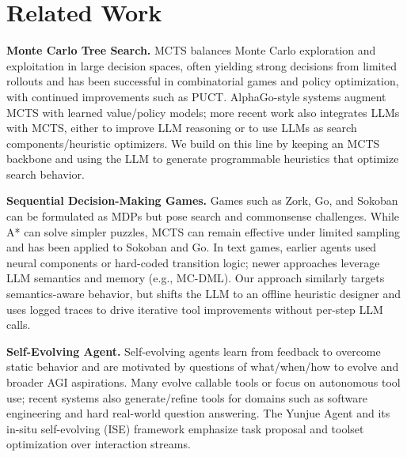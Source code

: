 \documentclass{article}
\begin{document}
\section{Related Work}
\label{sec:related}

\textbf{Monte Carlo Tree Search.} MCTS balances Monte Carlo exploration and exploitation in large decision spaces, often yielding strong decisions from limited rollouts\cite{Part2MCSurvey,Part2MCTSCoulom} and has been successful in combinatorial games and policy optimization\cite{Part2MCSurvey,Part2GoNNMCTS,Part2PGTS}, with continued improvements such as PUCT\cite{Part2MCSurvey}. AlphaGo-style systems augment MCTS with learned value/policy models\cite{Part2GoNNMCTS}; more recent work also integrates LLMs with MCTS, either to improve LLM reasoning or to use LLMs as search components/heuristic optimizers\cite{Part2PGTS,Part2MCLLM,Part2PlanHeuris}. We build on this line by keeping an MCTS backbone and using the LLM to generate programmable heuristics that optimize search behavior\cite{Part2PlanHeuris}.

\textbf{Sequential Decision-Making Games.} Games such as Zork, Go, and Sokoban can be formulated as MDPs\cite{Part1Jericho,Part2MCSurvey,Part1Jericho,Part1SokobanMCTS} but pose search and commonsense challenges\cite{Part1Jericho}. While A* can solve simpler puzzles, MCTS can remain effective under limited sampling and has been applied to Sokoban and Go\cite{Part1SokobanMCTS,Part1SokobanDRL,Part2GoNNMCTS}. In text games, earlier agents used neural components or hard-coded transition logic\cite{Part1Jericho,Part1NAIL}; newer approaches leverage LLM semantics and memory (e.g., MC-DML)\cite{Part2MCLLM}. Our approach similarly targets semantics-aware behavior, but shifts the LLM to an offline heuristic designer and uses logged traces to drive iterative tool improvements without per-step LLM calls\cite{Part2MCLLM}.

\textbf{Self-Evolving Agent.} Self-evolving agents learn from feedback to overcome static behavior\cite{Part3SEA} and are motivated by questions of what/when/how to evolve\cite{Part3SEA} and broader AGI aspirations\cite{Part3ToolYunjue}. Many evolve callable tools\cite{Part3ReAct,Part3ToolYunjue} or focus on autonomous tool use\cite{Part3ReAct,Part3DPAgent}; recent systems also generate/refine tools for domains such as software engineering\cite{Part3LiveSWE} and hard real-world question answering\cite{Part3ToolYunjue}. The Yunjue Agent and its in-situ self-evolving (ISE) framework emphasize task proposal and toolset optimization over interaction streams\cite{Part3ToolYunjue}. 
\end{document}

